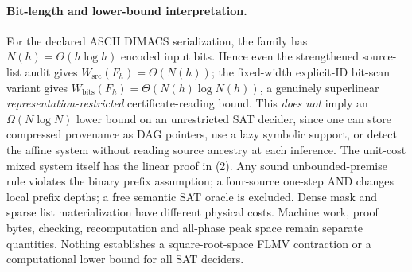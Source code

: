 \documentclass[11pt]{article}
\begin{document}
\paragraph{Bit-length and lower-bound interpretation.}
For the declared ASCII DIMACS serialization, the family has $N(h)=\Theta(h\log h)$ encoded input bits. Hence even the strengthened source-list audit gives $W_{\mathrm{src}}(F_h)=\Theta(N(h))$; the fixed-width explicit-ID bit-scan variant gives $W_{\mathrm{bits}}(F_h)=\Theta(N(h)\log N(h))$, a genuinely superlinear \emph{representation-restricted} certificate-reading bound. This \emph{does not} imply an $\Omega(N\log N)$ lower bound on an unrestricted SAT decider, since one can store compressed provenance as DAG pointers, use a lazy symbolic support, or detect the affine system without reading source ancestry at each inference. The unit-cost mixed system itself has the linear proof in (2). Any sound unbounded-premise rule violates the binary prefix assumption; a four-source one-step AND changes local prefix depths; a free semantic SAT oracle is excluded. Dense mask and sparse list materialization have different physical costs. Machine work, proof bytes, checking, recomputation and all-phase peak space remain separate quantities. Nothing establishes a square-root-space FLMV contraction or a computational lower bound for all SAT deciders.
\end{document}
